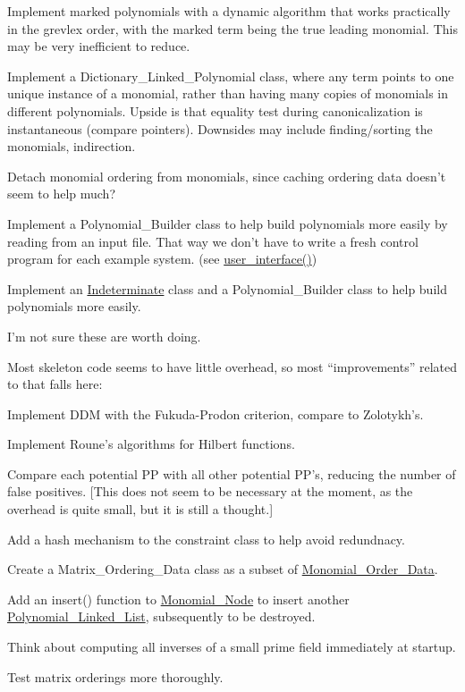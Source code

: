\begin{DoxyRefList}
\begin{DoxyItemize}
\item Implement marked polynomials with a dynamic algorithm that works practically in the grevlex order, with the marked term being the true leading monomial. This may be very inefficient to reduce.
\item Implement a {\ttfamily Dictionary\+\_\+\+Linked\+\_\+\+Polynomial} class, where any term points to one unique instance of a monomial, rather than having many copies of monomials in different polynomials. Upside is that equality test during canonicalization is instantaneous (compare pointers). Downsides may include finding/sorting the monomials, indirection.
\item Detach monomial ordering from monomials, since caching ordering data doesn't seem to help much?
\item Implement a {\ttfamily Polynomial\+\_\+\+Builder} class to help build polynomials more easily by reading from an input file. That way we don't have to write a fresh control program for each example system. (see \hyperlink{group__utils_ga72d205e8226d578b892515edc527cc83}{user\+\_\+interface()})
\item Implement an \hyperlink{group__polygroup_class_indeterminate}{Indeterminate} class and a {\ttfamily Polynomial\+\_\+\+Builder} class to help build polynomials more easily.
\end{DoxyItemize}

I'm not sure these are worth doing.
\begin{DoxyItemize}
\item Most skeleton code seems to have little overhead, so most ``improvements'' related to that falls here\+:
\begin{DoxyItemize}
\item Implement D\+DM with the Fukuda-\/\+Prodon criterion, compare to Zolotykh's.
\item Implement Roune's algorithms for Hilbert functions.
\item Compare each potential PP with all other potential PP's, reducing the number of false positives. \mbox{[}This does not seem to be necessary at the moment, as the overhead is quite small, but it is still a thought.\mbox{]}
\item Add a hash mechanism to the {\ttfamily constraint} class to help avoid redundnacy.
\end{DoxyItemize}
\item Create a Matrix\+\_\+\+Ordering\+\_\+\+Data class as a subset of \hyperlink{group__orderinggroup_class_monomial___order___data}{Monomial\+\_\+\+Order\+\_\+\+Data}.
\item Add an {\ttfamily insert()} function to \hyperlink{group__polygroup_class_monomial___node}{Monomial\+\_\+\+Node} to insert another \hyperlink{group__polygroup_class_polynomial___linked___list}{Polynomial\+\_\+\+Linked\+\_\+\+List}, subsequently to be destroyed.
\item Think about computing all inverses of a small prime field immediately at startup.
\item Test matrix orderings more thoroughly.
\end{DoxyItemize}
\end{DoxyRefList}